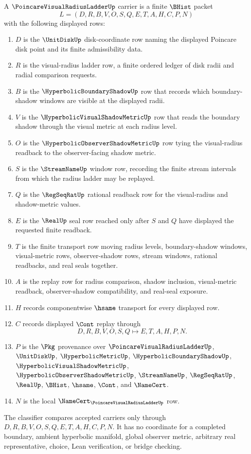 \begin{definition}
\label{def:poincare-visual-radius-ladder-carrier}
A $\PoincareVisualRadiusLadderUp$ carrier is a finite $\BHist$ packet
$$
L=(D,R,B,V,O,S,Q,E,T,A,H,C,P,N)
$$
with the following displayed rows:
\begin{enumerate}
\item $D$ is the $\UnitDiskUp$ disk-coordinate row naming the displayed Poincare disk point and its finite admissibility data.
\item $R$ is the visual-radius ladder row, a finite ordered ledger of disk radii and radial comparison requests.
\item $B$ is the $\HyperbolicBoundaryShadowUp$ row that records which boundary-shadow windows are visible at the displayed radii.
\item $V$ is the $\HyperbolicVisualShadowMetricUp$ row that reads the boundary shadow through the visual metric at each radius level.
\item $O$ is the $\HyperbolicObserverShadowMetricUp$ row tying the visual-radius readback to the observer-facing shadow metric.
\item $S$ is the $\StreamNameUp$ window row, recording the finite stream intervals from which the radius ladder may be replayed.
\item $Q$ is the $\RegSeqRatUp$ rational readback row for the visual-radius and shadow-metric values.
\item $E$ is the $\RealUp$ seal row reached only after $S$ and $Q$ have displayed the requested finite readback.
\item $T$ is the finite transport row moving radius levels, boundary-shadow windows, visual-metric rows, observer-shadow rows, stream windows, rational readbacks, and real seals together.
\item $A$ is the replay row for radius comparison, shadow inclusion, visual-metric readback, observer-shadow compatibility, and real-seal exposure.
\item $H$ records componentwise $\hsame$ transport for every displayed row.
\item $C$ records displayed $\Cont$ replay through
$$
D,R,B,V,O,S,Q \longmapsto E,T,A,H,P,N .
$$
\item $P$ is the $\Pkg$ provenance over $\PoincareVisualRadiusLadderUp$, $\UnitDiskUp$, $\HyperbolicMetricUp$, $\HyperbolicBoundaryShadowUp$, $\HyperbolicVisualShadowMetricUp$, $\HyperbolicObserverShadowMetricUp$, $\StreamNameUp$, $\RegSeqRatUp$, $\RealUp$, $\BHist$, $\hsame$, $\Cont$, and $\NameCert$.
\item $N$ is the local $\NameCert_{\PoincareVisualRadiusLadderUp}$ row.
\end{enumerate}
The classifier compares accepted carriers only through $D,R,B,V,O,S,Q,E,T,A,H,C,P,N$. It has no coordinate for a completed boundary, ambient hyperbolic manifold, global observer metric, arbitrary real representative, choice, Lean verification, or bridge checking.
\end{definition}

